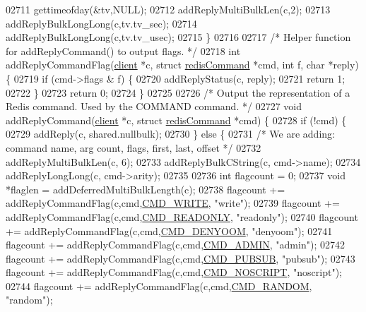 \begin{DoxyCode}
{{{{{{{{{{{{{{{{{{{{{{{{{{{{{{{{{{02711     gettimeofday(&tv,NULL);
02712     addReplyMultiBulkLen(c,2);
02713     addReplyBulkLongLong(c,tv.tv\_sec);
02714     addReplyBulkLongLong(c,tv.tv\_usec);
02715 \}
02716 
02717 \textcolor{comment}{/* Helper function for addReplyCommand() to output flags. */}
02718 \textcolor{keywordtype}{int} addReplyCommandFlag(\hyperlink{structclient}{client} *c, \textcolor{keyword}{struct} \hyperlink{structredisCommand}{redisCommand} *cmd, \textcolor{keywordtype}{int} f, \textcolor{keywordtype}{char} *reply) \{
02719     \textcolor{keywordflow}{if} (cmd->flags & f) \{
02720         addReplyStatus(c, reply);
02721         \textcolor{keywordflow}{return} 1;
02722     \}
02723     \textcolor{keywordflow}{return} 0;
02724 \}
02725 
02726 \textcolor{comment}{/* Output the representation of a Redis command. Used by the COMMAND command. */}
02727 \textcolor{keywordtype}{void} addReplyCommand(\hyperlink{structclient}{client} *c, \textcolor{keyword}{struct} \hyperlink{structredisCommand}{redisCommand} *cmd) \{
02728     \textcolor{keywordflow}{if} (!cmd) \{
02729         addReply(c, shared.nullbulk);
02730     \} \textcolor{keywordflow}{else} \{
02731         \textcolor{comment}{/* We are adding: command name, arg count, flags, first, last, offset */}
02732         addReplyMultiBulkLen(c, 6);
02733         addReplyBulkCString(c, cmd->name);
02734         addReplyLongLong(c, cmd->arity);
02735 
02736         \textcolor{keywordtype}{int} flagcount = 0;
02737         \textcolor{keywordtype}{void} *flaglen = addDeferredMultiBulkLength(c);
02738         flagcount += addReplyCommandFlag(c,cmd,\hyperlink{server_8h_a7391deb9c3a262ded3e186e94eb884e2}{CMD\_WRITE}, \textcolor{stringliteral}{"write"});
02739         flagcount += addReplyCommandFlag(c,cmd,\hyperlink{server_8h_a7e9c728f228e1c82ae1e22173375abcf}{CMD\_READONLY}, \textcolor{stringliteral}{"readonly"});
02740         flagcount += addReplyCommandFlag(c,cmd,\hyperlink{server_8h_aef97c640ad8dfdaca21eb67d4c37e447}{CMD\_DENYOOM}, \textcolor{stringliteral}{"denyoom"});
02741         flagcount += addReplyCommandFlag(c,cmd,\hyperlink{server_8h_a1917805ea3942a4784ec806c33bc6033}{CMD\_ADMIN}, \textcolor{stringliteral}{"admin"});
02742         flagcount += addReplyCommandFlag(c,cmd,\hyperlink{server_8h_a201d97fc457fe5bd58cb863b4ac7a0cc}{CMD\_PUBSUB}, \textcolor{stringliteral}{"pubsub"});
02743         flagcount += addReplyCommandFlag(c,cmd,\hyperlink{server_8h_aaf26ba9b59589bc7701e36fb440a0fbe}{CMD\_NOSCRIPT}, \textcolor{stringliteral}{"noscript"});
02744         flagcount += addReplyCommandFlag(c,cmd,\hyperlink{server_8h_a9f6608fefa355981c2a865ef3d44f196}{CMD\_RANDOM}, \textcolor{stringliteral}{"random"});
}}}}}}}}}}}}}}}}}}}}}}}}}}}}}}}}}}
\end{DoxyCode}
